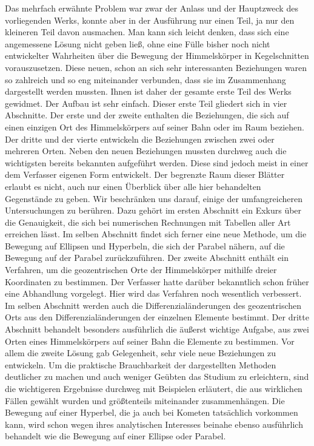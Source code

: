 Das mehrfach erwähnte Problem war zwar der Anlass und der Hauptzweck des vorliegenden Werks, konnte aber in der Ausführung nur einen Teil, ja nur den kleineren Teil davon ausmachen. Man kann sich leicht denken, dass sich eine angemessene Lösung nicht geben ließ, ohne eine Fülle bisher noch nicht entwickelter Wahrheiten über die Bewegung der Himmelskörper in Kegelschnitten vorauszusetzen. Diese neuen, schon an sich sehr interessanten Beziehungen waren so zahlreich und so eng miteinander verbunden, dass sie im Zusammenhang dargestellt werden mussten. Ihnen ist daher der gesamte erste Teil des Werks gewidmet. Der Aufbau ist sehr einfach. Dieser erste Teil gliedert sich in vier Abschnitte. Der erste und der zweite enthalten die Beziehungen, die sich auf einen einzigen Ort des Himmelskörpers auf seiner Bahn oder im Raum beziehen. Der dritte und der vierte entwickeln die Beziehungen zwischen zwei oder mehreren Orten. Neben den neuen Beziehungen mussten durchweg auch die wichtigsten bereits bekannten aufgeführt werden. Diese sind jedoch meist in einer dem Verfasser eigenen Form entwickelt. Der begrenzte Raum dieser Blätter erlaubt es nicht, auch nur einen Überblick über alle hier behandelten Gegenstände zu geben. Wir beschränken uns darauf, einige der umfangreicheren Untersuchungen zu berühren. Dazu gehört im ersten Abschnitt ein Exkurs
über die Genauigkeit, die sich bei numerischen Rechnungen mit Tabellen aller Art erreichen lässt. Im selben Abschnitt findet sich ferner eine neue Methode, um die Bewegung auf Ellipsen und Hyperbeln, die sich der Parabel nähern, auf die Bewegung auf der Parabel zurückzuführen. Der zweite Abschnitt enthält ein Verfahren, um die geozentrischen Orte der Himmelskörper mithilfe dreier Koordinaten zu bestimmen. Der Verfasser hatte darüber bekanntlich schon früher eine Abhandlung vorgelegt. Hier wird das Verfahren noch wesentlich verbessert. Im selben Abschnitt werden auch die Differenzialänderungen des geozentrischen Orts aus den Differenzialänderungen der einzelnen Elemente bestimmt. Der dritte Abschnitt behandelt besonders ausführlich die äußerst wichtige Aufgabe, aus zwei Orten eines Himmelskörpers auf seiner Bahn die Elemente zu bestimmen. Vor allem die zweite Lösung gab Gelegenheit, sehr viele neue Beziehungen zu entwickeln. Um die praktische Brauchbarkeit der dargestellten Methoden deutlicher zu machen und auch weniger Geübten das Studium zu erleichtern, sind die wichtigeren Ergebnisse durchweg mit Beispielen erläutert, die aus wirklichen Fällen gewählt wurden und größtenteils miteinander zusammenhängen. Die Bewegung auf einer Hyperbel, die ja auch bei Kometen tatsächlich vorkommen kann, wird schon wegen ihres analytischen Interesses beinahe ebenso ausführlich behandelt wie die Bewegung auf einer Ellipse oder Parabel.

